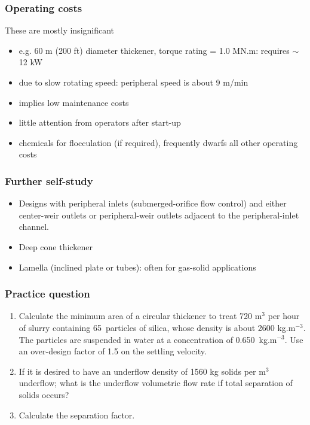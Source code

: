 \begin{frame}\frametitle{Operating costs}
	These are mostly insignificant
	\begin{itemize}
		\item	e.g. 60 m (200 ft) diameter thickener, torque rating = 1.0 MN.m: requires $\sim$ 12 kW
		\item	due to slow rotating speed: peripheral speed is about 9 m/min
		\item	implies low maintenance costs
		\item	little attention from operators after start-up
		\item	chemicals for flocculation (if required), frequently dwarfs all other operating costs 
	\end{itemize}
\end{frame}

\begin{frame}\frametitle{Further self-study}
	\begin{itemize}
		\item	Designs with peripheral inlets (submerged-orifice flow control) and either center-weir outlets or peripheral-weir outlets adjacent to the peripheral-inlet channel.
		\item	Deep cone thickener
		\item	Lamella (inclined plate or tubes): often for gas-solid applications
	\end{itemize}
\end{frame}

\begin{frame}\frametitle{Practice question}
	\begin{enumerate}
		\item	Calculate the minimum area of a circular thickener to treat 720 $\text{m}^3$ per hour of slurry containing 65\micron~particles of silica, whose density is about 2600 kg.$\text{m}^{-3}$. The particles are suspended in water at a concentration of 0.650~kg.$\text{m}^{-3}$. Use an over-design factor of 1.5 on the settling velocity. \newline {\color{myOrange}[Ans: $v = 3.7/1.5~\text{mm.s}^{-1}$ and $A=81.4~\text{m}^{2}$]}
		\item	If it is desired to have an underflow density of 1560 kg solids per $\text{m}^{3}$ underflow; what is the underflow volumetric flow rate if total separation of solids occurs? \newline {\color{myOrange}[Ans: $Q_\text{under} = 0.3~\text{m}^3~\text{solids.hr}^{-1}$]}
		\item	Calculate the separation factor.
	\end{enumerate}
\end{frame}

